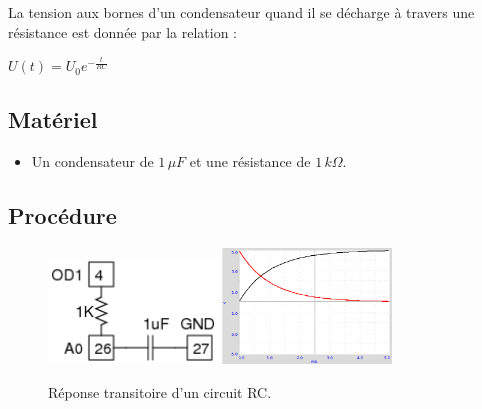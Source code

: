 \documentclass{book}
\begin{document}
La tension aux bornes d'un condensateur quand il se décharge à travers une résistance est donnée par la relation :



$U(t)=U_{0}e^{-\frac{t}{RC} }$

\subsection{Matériel}


\begin{itemize}
  \item Un condensateur de $1\,\mu F$  et une résistance de $1\, k\Omega$.
\end{itemize}

\subsection{Procédure}


\begin{figure}[h!]
\begin{center}
\caption{\label{fig:Capacitor-screenshot}Réponse transitoire d'un circuit RC. }\vspace{0.5em}
\includegraphics[width=0.4\textwidth, height=0.3\textwidth, keepaspectratio]{Schematic-rc-tran.png}
\includegraphics[width=0.4\textwidth, height=0.3\textwidth, keepaspectratio]{Pic-CR-transient-screen.png}
\end{center}
\end{figure}
\end{document}
